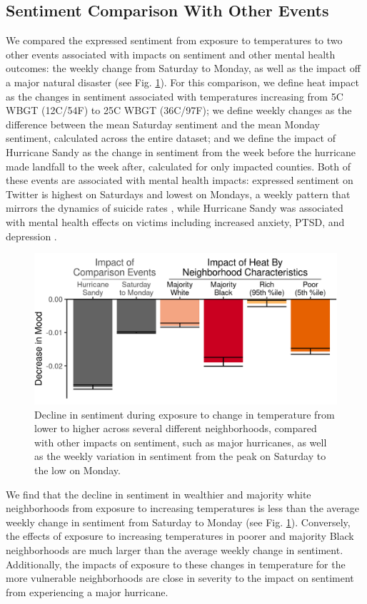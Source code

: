 \documentclass[fleqn,10pt]{wlscirep}
\begin{document}
\subsection*{Sentiment Comparison With Other Events}
We compared the expressed sentiment from exposure to temperatures to two other events associated with impacts on sentiment and other mental health outcomes: the weekly change from Saturday to Monday, as well as the impact off a major natural disaster (see Fig. \ref{fig:compare}). For this comparison, we define heat impact as the changes in sentiment associated with temperatures increasing from 5\textdegree C WBGT (12\textdegree C/54\textdegree F) to 25\textdegree C WBGT (36\textdegree C/97\textdegree F); we define weekly changes as the difference between the mean Saturday sentiment and the mean Monday sentiment, calculated across the entire dataset; and we define the impact of Hurricane Sandy as the change in sentiment from the week before the hurricane made landfall to the week after, calculated for only impacted counties. Both of these events are associated with mental health impacts: expressed sentiment on Twitter is highest on Saturdays and lowest on Mondays, a weekly pattern that mirrors the dynamics of suicide rates \cite{CDC2021}, while Hurricane Sandy was associated with mental health effects on victims including increased anxiety, PTSD, and depression \cite{Schwartz2017Aug, Lieberman-Cribbin2017}.


\begin{figure}[H]
  \centering
  \includegraphics[width=0.66\linewidth]{../res/comparison_plot.png}
  \caption{Decline in sentiment during exposure to change in temperature from lower to higher across several different neighborhoods, compared with other impacts on sentiment, such as major hurricanes, as well as the weekly variation in sentiment from the peak on Saturday to the low on Monday.}
  \label{fig:compare}
\end{figure}

We find that the decline in sentiment in wealthier and majority white neighborhoods from exposure to increasing temperatures is less than the average weekly change in sentiment from Saturday to Monday (see Fig. \ref{fig:compare}). Conversely, the effects of exposure to increasing temperatures in poorer and majority Black neighborhoods are much larger than the average weekly change in sentiment. Additionally, the impacts of exposure to these changes in temperature for the more vulnerable neighborhoods are close in severity to the impact on sentiment from experiencing a major hurricane.
\end{document}
